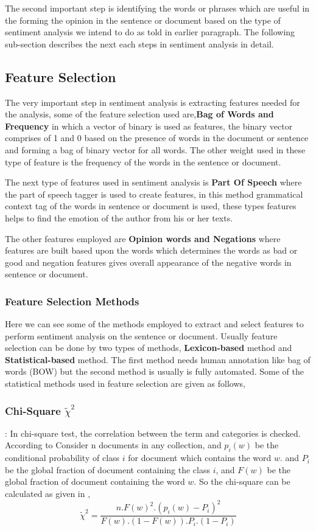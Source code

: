 \documentclass[sigconf]{acmart}
\begin{document}
The second important step is identifying the words or phrases which are useful in the forming the opinion in the sentence or document based on the type of sentiment analysis we intend to do as told in earlier paragraph. The following sub-section describes the next each steps in sentiment analysis in detail.

\subsection{Feature Selection}
The very important step in sentiment analysis is extracting features needed for the analysis, some of the feature selection used are,\textbf{Bag of Words and Frequency} in which a vector of binary is used as features, the binary vector comprises of 1 and 0 based on the presence of words in the document or sentence and forming a bag of binary vector for all words. The other weight used in these type of feature is the frequency of the words in the sentence or document. 

The next type of features used in sentiment analysis is \textbf{Part Of Speech} where the part of speech tagger is used to create features, in this method grammatical context tag of the words in sentence or document is used, these types features helps to find the emotion of the author from his or her texts.

The other features employed are \textbf{Opinion words and Negations} where features are built based upon the words which determines the words as bad or good and negation features gives overall appearance of the negative words in sentence or document.
\subsubsection{Feature Selection Methods} 
Here we can see some of the methods employed to extract and select features to perform sentiment analysis on the sentence or document. Usually feature selection can be done by two types of methods, \textbf{Lexicon-based} \cite{lexi} method and \textbf{Statistical-based} \cite{statis} method. The first method needs human annotation like bag of words (BOW) \cite{lexi} but the second method is usually is fully automated. Some of the statistical methods used in feature selection are given as follows,
\subsubsection*{Chi-Square $\tilde{\chi}^2$} : In chi-square test, the correlation between the term and categories is checked. According to \cite{sentianalysis} Consider n documents in any collection, and $p_{i}(w)$ be the conditional probability of class $i$ for document which contains the word $w$. and $P_{i}$ be the global fraction of document containing the class $i$, and $F(w)$ be the global fraction of document containing the word $w$. So the chi-square can be calculated as given in \cite{sentianalysis},
$$\tilde{\chi}^2 = \frac{n.F(w)^{2}.(p_{i}(w)-P_{i})^2}{F(w).(1-F(w)).P_{i}.(1-P_{i})}$$
\end{document}
